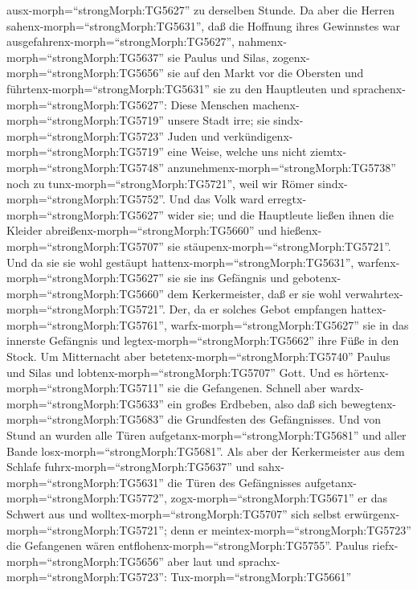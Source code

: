 ausx-morph=``strongMorph:TG5627'' zu derselben Stunde.  Da
aber die Herren sahenx-morph=``strongMorph:TG5631'', daß die Hoffnung
ihres Gewinnstes war ausgefahrenx-morph=``strongMorph:TG5627'',
nahmenx-morph=``strongMorph:TG5637'' sie Paulus und Silas,
zogenx-morph=``strongMorph:TG5656'' sie auf den Markt vor die Obersten
 und führtenx-morph=``strongMorph:TG5631'' sie zu den
Hauptleuten und sprachenx-morph=``strongMorph:TG5627'': Diese Menschen
machenx-morph=``strongMorph:TG5719'' unsere Stadt irre; sie
sindx-morph=``strongMorph:TG5723'' Juden  und
verkündigenx-morph=``strongMorph:TG5719'' eine Weise, welche uns nicht
ziemtx-morph=``strongMorph:TG5748''
anzunehmenx-morph=``strongMorph:TG5738'' noch zu
tunx-morph=``strongMorph:TG5721'', weil wir Römer
sindx-morph=``strongMorph:TG5752''.  Und das Volk ward
erregtx-morph=``strongMorph:TG5627'' wider sie; und die Hauptleute
ließen ihnen die Kleider abreißenx-morph=``strongMorph:TG5660'' und
hießenx-morph=``strongMorph:TG5707'' sie
stäupenx-morph=``strongMorph:TG5721''.  Und da sie sie wohl
gestäupt hattenx-morph=``strongMorph:TG5631'',
warfenx-morph=``strongMorph:TG5627'' sie sie ins Gefängnis und
gebotenx-morph=``strongMorph:TG5660'' dem Kerkermeister, daß er sie wohl
verwahrtex-morph=``strongMorph:TG5721''.  Der, da er
solches Gebot empfangen hattex-morph=``strongMorph:TG5761'',
warfx-morph=``strongMorph:TG5627'' sie in das innerste Gefängnis und
legtex-morph=``strongMorph:TG5662'' ihre Füße in den Stock.
 Um Mitternacht aber betetenx-morph=``strongMorph:TG5740''
Paulus und Silas und lobtenx-morph=``strongMorph:TG5707'' Gott. Und es
hörtenx-morph=``strongMorph:TG5711'' sie die Gefangenen. 
Schnell aber wardx-morph=``strongMorph:TG5633'' ein großes Erdbeben,
also daß sich bewegtenx-morph=``strongMorph:TG5683'' die Grundfesten des
Gefängnisses. Und von Stund an wurden alle Türen
aufgetanx-morph=``strongMorph:TG5681'' und aller Bande
losx-morph=``strongMorph:TG5681''.  Als aber der
Kerkermeister aus dem Schlafe fuhrx-morph=``strongMorph:TG5637'' und
sahx-morph=``strongMorph:TG5631'' die Türen des Gefängnisses
aufgetanx-morph=``strongMorph:TG5772'',
zogx-morph=``strongMorph:TG5671'' er das Schwert aus und
wolltex-morph=``strongMorph:TG5707'' sich selbst
erwürgenx-morph=``strongMorph:TG5721''; denn er
meintex-morph=``strongMorph:TG5723'' die Gefangenen wären
entflohenx-morph=``strongMorph:TG5755''.  Paulus
riefx-morph=``strongMorph:TG5656'' aber laut und
sprachx-morph=``strongMorph:TG5723'': Tux-morph=``strongMorph:TG5661''
